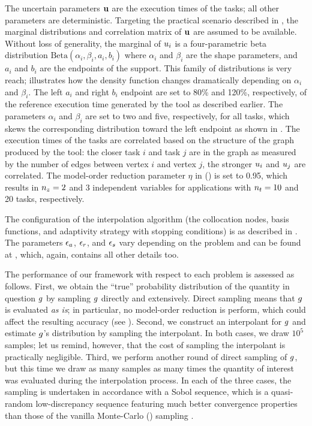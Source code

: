 
The uncertain parameters $\mathbf{u}$ are the execution times of the tasks; all other
parameters are deterministic. Targeting the practical scenario described in
, the marginal distributions and correlation matrix of $\mathbf{u}$
are assumed to be available. Without loss of generality, the marginal of $u_i$
is a four-parametric beta distribution $\text{Beta}(\alpha_i, \beta_i, a_i,
b_i)$ where $\alpha_i$ and $\beta_i$ are the shape parameters, and $a_i$ and
$b_i$ are the endpoints of the support. This family of distributions is very
reach;  illustrates how the density function changes
dramatically depending on $\alpha_i$ and $\beta_i$. The left $a_i$ and right
$b_i$ endpoint are set to 80\% and 120\%, respectively, of the reference
execution time generated by the  tool as described earlier. The
parameters $\alpha_i$ and $\beta_i$ are set to two and five, respectively, for
all tasks, which skews the corresponding distribution toward the left endpoint
as shown in . The execution times of the tasks are correlated
based on the structure of the graph produced by the  tool: the closer
task $i$ and task $j$ are in the graph as measured by the number of edges
between vertex $i$ and vertex $j$, the stronger $u_i$ and $u_j$ are
correlated. The model-order reduction parameter $\eta$ in 
() is set to 0.95, which results in ${n_z} = 2$ and 3 independent
variables for applications with ${n_t} = 10$ and 20 tasks, respectively.

The configuration of the interpolation algorithm (the collocation nodes, basis
functions, and adaptivity strategy with stopping conditions) is as described in
. The parameters $\epsilon_a$, $\epsilon_r$, and $\epsilon_s$ vary
depending on the problem and can be found at \cite{sources}, which, again,
contains all other details too.

The performance of our framework with respect to each problem is assessed as
follows. First, we obtain the ``true'' probability distribution of the quantity
in question $g$ by sampling $g$ directly and extensively. Direct sampling
means that $g$ is evaluated \emph{as is}; in particular, no model-order
reduction is perform, which could affect the resulting accuracy (see
). Second, we construct an interpolant for $g$ and estimate
$g$'s distribution by sampling the interpolant. In both cases, we draw $10^5$
samples; let us remind, however, that the cost of sampling the interpolant is
practically negligible. Third, we perform another round of direct sampling of
$g$, but this time we draw as many samples as many times the quantity of
interest was evaluated during the interpolation process. In each of the three
cases, the sampling is undertaken in accordance with a Sobol sequence, which is
a quasi-random low-discrepancy sequence featuring much better convergence
properties than those of the vanilla Monte-Carlo () sampling
\cite{joe2008}.

